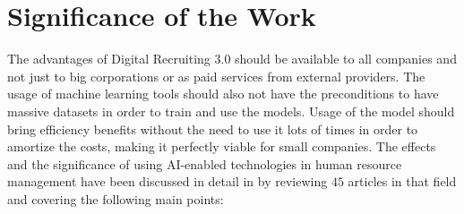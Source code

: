\documentclass[draft,final]{thesisclass} %
\begin{document}
\section{Significance of the Work} \label{significance_of_the_work}
The advantages of Digital Recruiting 3.0 should be available to all companies and not just to big corporations or as paid services from external providers.
The usage of machine learning tools should also not have the preconditions to have massive datasets in order to train and use the models.
Usage of the model should bring efficiency benefits without the need to use it lots of times in order to amortize the costs, making it perfectly viable for small companies.
The effects and the significance of using \acs{AI}-enabled technologies in human resource management have been discussed in detail in \textcite{ai_hrm_review} by reviewing $45$ articles in that field and covering the following main points:
\end{document}
